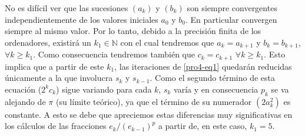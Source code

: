 \documentclass[a4paper]{article}
\begin{document}
No es difícil ver que las sucesiones $(a_k)$ y $(b_k)$ son siempre convergentes independientemente de los valores iniciales $a_0$ y $b_0$. En particular convergen siempre al mismo valor. Por lo tanto, debido a la precisión finita de los ordenadores, existirá un $k_1\in\mathbb{N}$ con el cual tendremos que $a_k=a_{k+1}$ y $b_k=b_{k+1}$, $\forall k\geq k_1$. Como consecuencia tendremos también que $c_k=c_{k+1}$ $\forall k\geq k_1$. Esto implica que a partir de este $k_1$, las iteraciones de \eqref{pro4-eq1} quedarán reducidas únicamente a la que involucra $s_k$ y $s_{k-1}$. Como el segundo término de esta ecuación ($2^kc_k$) sigue variando para cada $k$, $s_k$ varía y en consecuencia $p_k$ se va alejando de $\pi$ (su límite teórico), ya que el término de su numerador $(2a_k^2)$ es constante. A esto se debe que apreciemos estas diferencias muy significativas en los cálculos de las fracciones $e_k/(e_{k-1})^p$ a partir de, en este caso, $k_1=5$.
\newpage
\end{document}

